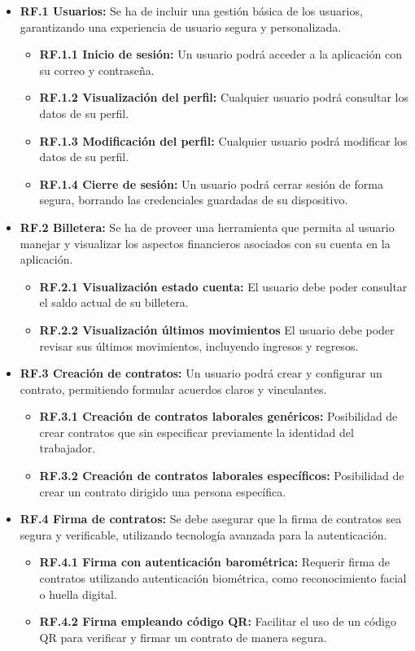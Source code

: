 \begin{itemize}

\item \textbf{RF.1 Usuarios:} Se ha de incluir una gestión básica de los usuarios, garantizando una experiencia de usuario segura y personalizada.
	\begin{itemize}
	\item \textbf{RF.1.1 Inicio de sesión:} Un usuario podrá acceder a la aplicación con su correo y 	contraseña.
	\item \textbf{RF.1.2 Visualización del perfil:} Cualquier usuario podrá consultar los datos de su perfil.
	\item \textbf{RF.1.3 Modificación del perfil:} Cualquier usuario podrá modificar los datos de su perfil.
	\item \textbf{RF.1.4 Cierre de sesión:} Un usuario podrá cerrar sesión de forma segura, borrando 	las credenciales guardadas de su dispositivo.
	\end{itemize}
	
\item \textbf{RF.2 Billetera:} Se ha de proveer una herramienta que permita al usuario manejar y visualizar los aspectos financieros asociados con su cuenta en la aplicación.

	\begin{itemize}
	\item \textbf{RF.2.1 Visualización estado cuenta:} El usuario debe poder consultar el saldo	 		actual de su billetera.
	\item \textbf{RF.2.2 Visualización últimos movimientos} El usuario debe poder revisar sus 				últimos movimientos, incluyendo ingresos y regresos.
	\end{itemize}	
	
\item \textbf{RF.3 Creación de contratos:} Un usuario podrá crear y configurar un contrato, permitiendo formular acuerdos claros y vinculantes.
	\begin{itemize}
	\item \textbf{RF.3.1 Creación de contratos laborales genéricos:} Posibilidad de crear contratos		que sin especificar previamente la identidad del trabajador.
	\item \textbf{RF.3.2 Creación de contratos laborales específicos:} Posibilidad de crear un 			contrato dirigido una persona específica.
	\end{itemize}
	
\item \textbf{RF.4 Firma de contratos:} Se debe asegurar que la firma de contratos sea segura y verificable, utilizando tecnología avanzada para la autenticación.
	\begin{itemize}
	\item \textbf{RF.4.1 Firma con autenticación barométrica:} Requerir firma de contratos 				utilizando autenticación biométrica, como reconocimiento facial o huella digital.
	\item \textbf{RF.4.2 Firma empleando código QR:} Facilitar el uso de un código QR para verificar 	y firmar un contrato de manera segura.
	\end{itemize}
	

\end{itemize}
